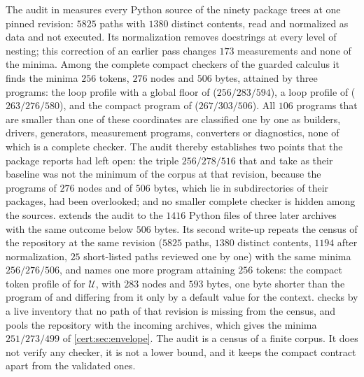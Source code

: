 The audit in  measures every Python source of the ninety
package trees at one pinned revision: $5825$ paths with $1380$ distinct
contents, read and normalized as data and not executed. Its normalization
removes docstrings at every level of nesting; this correction of an earlier
pass changes $173$ measurements and none of the minima. Among the complete
compact checkers of the guarded calculus it finds the minima $256$ tokens,
$276$ nodes and $506$ bytes, attained by three programs: the loop profile
with a global floor of  ($256/283/594$), a loop
profile of  ($263/276/580$), and the compact
program of  ($267/303/506$). All $106$
programs that are smaller than one of these coordinates are classified one by
one as builders, drivers, generators, measurement programs, converters or
diagnostics, none of which is a complete checker. The audit thereby
establishes two points that the package reports had left open: the triple
$256/278/516$ that  and  take as
their baseline was not the minimum of the corpus at that revision, because
the programs of $276$ nodes and of $506$ bytes, which lie in subdirectories
of their packages, had been overlooked; and no smaller complete checker is
hidden among the sources.  extends the audit to
the $1416$ Python files of three later archives with the same outcome below
$506$ bytes. Its second write-up repeats the census of the repository at the
same revision ($5825$ paths, $1380$ distinct contents, $1194$ after
normalization, $25$ short-listed paths reviewed one by one) with the same
minima $256/276/506$, and names one more program attaining $256$ tokens: the
compact token profile of  for $\mathcal U$, with $283$
nodes and $593$ bytes, one byte shorter than the program of
 and differing from it only by a default value for the
context.  checks by a live inventory that no path of that
revision is missing from the census, and pools the repository with the
incoming archives, which gives the minima $251/273/499$ of
\cref{cert:sec:envelope}. The audit is a census of a finite corpus. It does not verify any
checker, it is not a lower bound, and it keeps the compact contract apart
from the validated ones.

